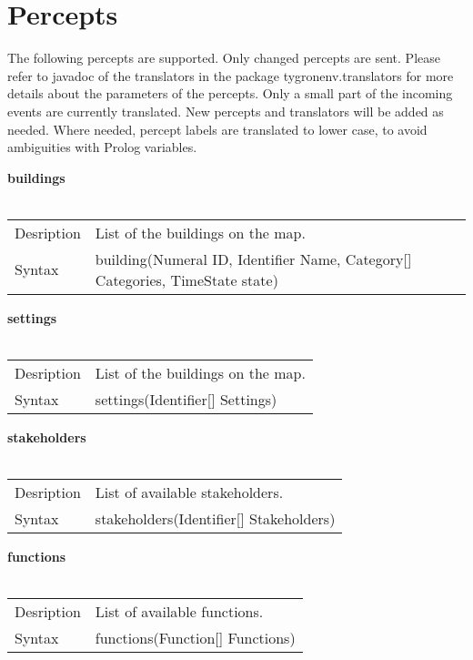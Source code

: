 \documentclass[english,11pt]{article}
\begin{document}
\section{Percepts}

The following percepts are supported. Only changed percepts are sent. Please refer to javadoc of the translators in the package tygronenv.translators for more details about the parameters of the percepts. Only a small part of the incoming events are currently translated. New percepts and translators will be added as needed. Where needed, percept labels are translated to lower case, to avoid ambiguities with Prolog variables.
\newline


\textbf{buildings}\\
\\
\begin{tabularx}{\textwidth}{lX}
 Desription & List of the buildings on the map. \\
 Syntax & building(Numeral ID, Identifier Name, Category[] Categories, TimeState state) \\
\end{tabularx}
\newline

\textbf{settings}\\
\\
\begin{tabularx}{\textwidth}{lX}
 Desription & List of the buildings on the map. \\
 Syntax & settings(Identifier[] Settings) \\
\end{tabularx}
\newline

\textbf{stakeholders}\\
\\
\begin{tabularx}{\textwidth}{lX}
 Desription & List of available stakeholders. \\
 Syntax & stakeholders(Identifier[] Stakeholders) \\
\end{tabularx}
\newline

\textbf{functions}\\
\\
\begin{tabularx}{\textwidth}{lX}
 Desription & List of available functions. \\
 Syntax & functions(Function[] Functions) \\
\end{tabularx}
\newline
\end{document}
